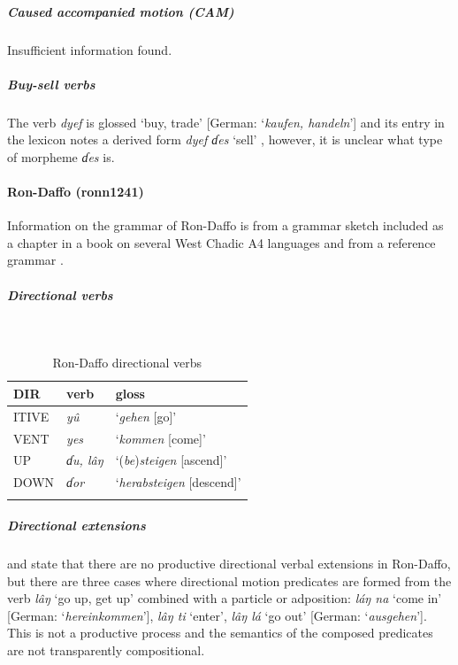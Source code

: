 \subparagraph{Caused accompanied motion (CAM)}



Insufficient information found. 

\subparagraph{Buy-sell verbs}



The verb \textit{dyef} is glossed `buy, trade' [German: `\textit{kaufen, handeln}'] and its entry in the lexicon notes a derived form \textit{dyef ɗes} `sell' \citep[351]{jungraithmayrRonSprachenTaschadohamitischeStudien1970}, however, it is unclear what type of morpheme \textit{ɗes} is.

\paragraph*{Ron-Daffo (ronn1241)}

Information on the grammar of Ron-Daffo is from a grammar sketch included as a chapter in a book on several West Chadic A4 languages \citep{jungraithmayrRonSprachenTaschadohamitischeStudien1970} and from a reference grammar \citep[43]{seibertRonDaffoJosPlateau1998}.

\subparagraph{Directional verbs}~



\begin{table}[H]
	\caption{Ron-Daffo directional verbs} 
	\label{tab:rondV}
	\begin{tabular}{lll} %
		\lsptoprule
		DIR & verb & gloss   \\ %
		\midrule
		ITIVE & \textit{yû} & `\textit{gehen} [go]'  \\
		VENT & \textit{yes} & `\textit{kommen} [come]' \\
		UP & \textit{ɗu, lâŋ} & `(\textit{be})\textit{steigen} [ascend]' \\
		DOWN & \textit{ɗor} & `\textit{herabsteigen} [descend]' \\
		\lspbottomrule
	\end{tabular}
\end{table}

\subparagraph{Directional extensions}



\citet[119]{jungraithmayrRonSprachenTaschadohamitischeStudien1970} and \citet[43]{seibertRonDaffoJosPlateau1998} state that there are no productive directional verbal extensions in Ron-Daffo, but there are three cases where directional motion predicates are formed from the verb \textit{lâŋ} `go up, get up' combined with a particle or adposition: \textit{láŋ na} `come in' [German: `\textit{hereinkommen}'], \textit{lâŋ ti} `enter', \textit{lâŋ lá} `go out' [German: `\textit{ausgehen}']. This is not a productive process and the semantics of the composed predicates are not transparently compositional. 

